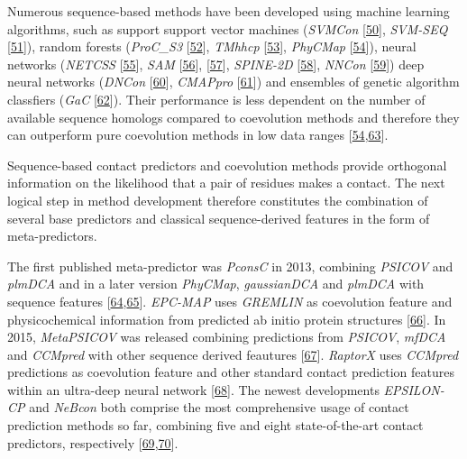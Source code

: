 \documentclass[12pt,a4paper,twoside]{book}
\theoremstyle{definition}
\theoremstyle{definition}
\theoremstyle{remark}
\begin{document}
Numerous sequence-based methods have been developed using machine
learning algorithms, such as support support vector machines
(\emph{SVMCon} {[}\protect\hyperlink{ref-Cheng2007}{50}{]},
\emph{SVM-SEQ} {[}\protect\hyperlink{ref-Wu2008}{51}{]}), random forests
(\emph{ProC\_S3} {[}\protect\hyperlink{ref-Li2011}{52}{]}, \emph{TMhhcp}
{[}\protect\hyperlink{ref-Wang2011}{53}{]}, \emph{PhyCMap}
{[}\protect\hyperlink{ref-Wang2013}{54}{]}), neural networks
(\emph{NETCSS} {[}\protect\hyperlink{ref-Fariselli2001a}{55}{]},
\emph{SAM} {[}\protect\hyperlink{ref-Shackelford2007}{56}{]},
{[}\protect\hyperlink{ref-Hamilton2004a}{57}{]}, \emph{SPINE-2D}
{[}\protect\hyperlink{ref-Xue2009a}{58}{]}, \emph{NNCon}
{[}\protect\hyperlink{ref-Tegge2009a}{59}{]}) deep neural networks
(\emph{DNCon} {[}\protect\hyperlink{ref-Eickholt2012}{60}{]},
\emph{CMAPpro} {[}\protect\hyperlink{ref-DiLena2012a}{61}{]}) and
ensembles of genetic algorithm classfiers (\emph{GaC}
{[}\protect\hyperlink{ref-Chen2010}{62}{]}). Their performance is less
dependent on the number of available sequence homologs compared to
coevolution methods and therefore they can outperform pure coevolution
methods in low data ranges
{[}\protect\hyperlink{ref-Wang2013}{54},\protect\hyperlink{ref-Kosciolek2015a}{63}{]}.

Sequence-based contact predictors and coevolution methods provide
orthogonal information on the likelihood that a pair of residues makes a
contact. The next logical step in method development therefore
constitutes the combination of several base predictors and classical
sequence-derived features in the form of meta-predictors.

The first published meta-predictor was \emph{PconsC} in 2013, combining
\emph{PSICOV} and \emph{plmDCA} and in a later version \emph{PhyCMap},
\emph{gaussianDCA} and \emph{plmDCA} with sequence features
{[}\protect\hyperlink{ref-Skwark2013}{64},\protect\hyperlink{ref-Skwark2016}{65}{]}.
\emph{EPC-MAP} uses \emph{GREMLIN} as coevolution feature and
physicochemical information from predicted ab initio protein structures
{[}\protect\hyperlink{ref-Schneider2014}{66}{]}. In 2015,
\emph{MetaPSICOV} was released combining predictions from \emph{PSICOV},
\emph{mfDCA} and \emph{CCMpred} with other sequence derived feautures
{[}\protect\hyperlink{ref-Jones2015a}{67}{]}. \emph{RaptorX} uses
\emph{CCMpred} predictions as coevolution feature and other standard
contact prediction features within an ultra-deep neural network
{[}\protect\hyperlink{ref-Wang2016a}{68}{]}. The newest developments
\emph{EPSILON-CP} and \emph{NeBcon} both comprise the most comprehensive
usage of contact prediction methods so far, combining five and eight
state-of-the-art contact predictors, respectively
{[}\protect\hyperlink{ref-Stahl2017}{69},\protect\hyperlink{ref-He2017}{70}{]}.
\end{document}
